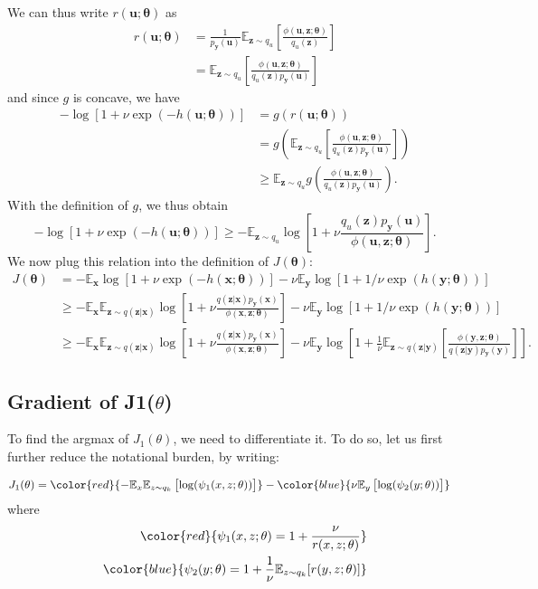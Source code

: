 \documentclass[11pt, oneside]{article}
\newcommand{\thetab}{{\boldsymbol{\theta}}}
\newcommand{\pnn}{\phi}
\newcommand{\pnoise}{p_{ \mathbf y}}
\renewcommand{\u}{{\mathbf u}}
\newcommand{\x}{{\mathbf x}}
\newcommand{\y}{{\mathbf y}}
\newcommand{\z}{{\mathbf z}}
\newcommand{\E}{\mathbb{E}}
\newcommand{\Ex}{\E_{\x}}
\newcommand{\Ey}{\E_{\y}}
\begin{document}
We can thus write $r(\u; \thetab)$ as
\begin{align}
  r(\u;\thetab) &= \frac{1}{\pnoise(\u)}  \E_{\z \sim q_u} \left[\frac{\pnn(\u,\z; \thetab)}{q_u(\z)}\right] \\
  & =  \E_{\z \sim q_u} \left[\frac{\pnn(\u,\z; \thetab)} {q_u(\z)\pnoise(\u)} \right]
\end{align}
and since $g$ is concave, we have
\begin{align}
  - \log [1+\nu \exp(-h(\u;\thetab))]  &= g(r(\u; \thetab)) \\
  & = g\left(\E_{\z \sim q_u} \left[\frac{\pnn(\u,\z; \thetab)} {q_u(\z)\pnoise(\u)} \right]\right)\\
  & \ge \E_{\z \sim q_u} g\left( \frac{\pnn(\u,\z; \thetab)} {q_u(\z)\pnoise(\u)} \right).
\end{align}
With the definition of $g$, we thus obtain
\begin{equation}
  - \log [1+\nu \exp(-h(\u;\thetab))]  \ge -\E_{\z \sim q_u} \log \left[1+\nu \frac{q_u(\z)\pnoise(\u)}{\pnn(\u,\z; \thetab)}\right].
\end{equation}
We now plug this relation into the definition of $J(\thetab)$:
\begin{align}
  J(\thetab)  &= - \Ex  \log \left[1+\nu \exp(-h(\x;\thetab))\right] - \nu \Ey \log \left[1+1/\nu \exp(h(\y;\thetab))\right]\\
  & \ge  -\Ex \E_{\z \sim q(\z|\x)} \log \left[1+\nu \frac{q(\z|\x)\pnoise(\x)}{\pnn(\x,\z; \thetab)}\right] -  \nu \Ey \log \left[1+1/\nu \exp(h(\y;\thetab))\right] \\
    &\geq -\Ex \E_{\z \sim q(\z|\x)} \log \left[1+\nu \frac{q(\z|\x)\pnoise(\x)}{\pnn(\x,\z; \thetab)}\right] -  \nu \Ey \log \left[1+\frac{1}{\nu} \E_{\z \sim q(\z | \y)} \left[\frac{\pnn(\y,\z; \thetab)} {q(\z | \y)\pnoise(\y)} \right]  \right].
\end{align}


\subsection{Gradient of J1($\theta$)}
\label{sec:appendix grad of J1}
To find the argmax of $J_1(\theta)$, we need to differentiate it. To do so, let us first further reduce the notational burden, by writing:

\begin{align}
J_1(\theta) & =  
              \color{red}{ - \mathbb{E}_{x} \mathbb{E}_{z \sim q_k} \left[ \log(\psi_1(x, z; \theta)) \right]} -        \color{blue}{ \nu \mathbb{E}_{y}  \left[  \log(\psi_2(y; \theta)) \right]}
\end{align}
where
\begin{align}
\color{red}{\psi_1(x, z; \theta) = 1 + \frac{\nu}{r(x, z; \theta)}} \\
\color{blue}{\psi_2(y; \theta) = 1 + \frac{1}{\nu} \mathbb{E}_{z \sim q_k}[r(y, z; \theta)]}
\end{align}
\end{document}
